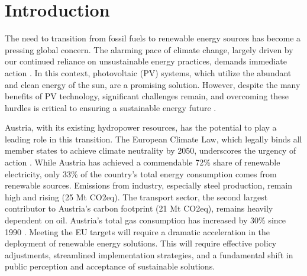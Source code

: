 \documentclass[draft, final]{vutinfth} %
\begin{document}
\chapter{Introduction}

The need to transition from fossil fuels to renewable energy sources has become a pressing global concern. The alarming pace of climate change, largely driven by our continued reliance on unsustainable energy practices, demands immediate action \cite{IPCC_2018_SR15}. In this context, photovoltaic (PV) systems, which utilize the abundant and clean energy of the sun, are a promising solution. However, despite the many benefits of PV technology, significant challenges remain, and overcoming these hurdles is critical to ensuring a sustainable energy future \cite{iea2020world}.

Austria, with its existing hydropower resources, has the potential to play a leading role in this transition. The European Climate Law, which legally binds all member states to achieve climate neutrality by 2050, underscores the urgency of action \cite{EUClimateLaw}.
While Austria has achieved a commendable 72\% share of renewable electricity, only 33\% of the country's total energy consumption comes from renewable sources. Emissions from industry, especially steel production, remain high and rising (25 Mt CO2eq). The transport sector, the second largest contributor to Austria's carbon footprint (21 Mt CO2eq), remains heavily dependent on oil. Austria's total gas consumption has increased by 30\% since 1990 \cite{StatistikAustria2024Energiebilanzen}. Meeting the EU targets will require a dramatic acceleration in the deployment of renewable energy solutions. This will require effective policy adjustments, streamlined implementation strategies, and a fundamental shift in public perception and acceptance of sustainable solutions.
\end{document}
